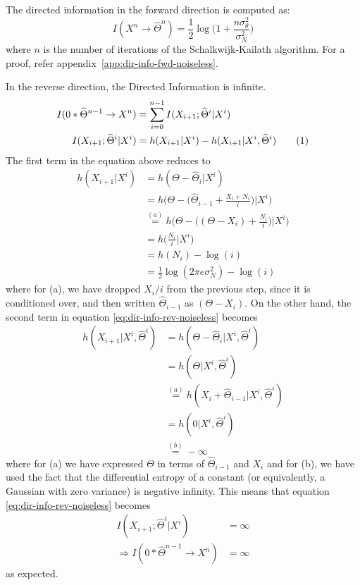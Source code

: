 \documentclass[letterpaper, 10pt, conference]{ieeeconf}
\newcommand\numberthis{\stepcounter{equation}\tag{\theequation}}
\begin{document}
The directed information in the forward direction is computed as:
\begin{equation*}
	I(X^{n} \rightarrow \widehat{\Theta}^{n}) = \frac{1}{2}\log \bigg( 1+\frac{n\sigma_{\theta}^{2}}{\sigma_{N}^{2}} \bigg)
\end{equation*}
where $n$ is the number of iterations of the Schalkwijk-Kailath algorithm. For a proof, refer appendix~\ref{app:dir-info-fwd-noiseless}.

In the reverse direction, the Directed Information is infinite.
\begin{align*}
	I(0*\widehat{\Theta}^{n-1}\rightarrow X^{n}) &= \sum_{i=0}^{n-1}I(X_{i+1};\widehat{\Theta}^{i}|X^{i}) \\
	I(X_{i+1};\widehat{\Theta}^{i}|X^{i})        &= h(X_{i+1}|X^{i}) - h(X_{i+1}|X^{i},\widehat{\Theta}^{i}) \numberthis \label{eq:dir-info-rev-noiseless}
\end{align*}
The first term in the equation above reduces to
\begin{align*}
	h(X_{i+1}|X^{i}) &= h(\Theta-\widehat{\Theta}_{i}|X^{i}) \\
					 &= h \bigg( \Theta- \bigg( \widehat{\Theta}_{i-1}+\frac{X_{i}+N_{i}}{i} \bigg) \bigg| X^{i} \bigg) \\
					 &\overset{(a)}{=} h \bigg( \Theta- \bigg( (\Theta - X_{i}) + \frac{N_{i}}{i} \bigg) \bigg| X^{i} \bigg) \\
					 &= h \bigg( \frac{N_{i}}{i} \bigg| X^{i} \bigg) \\
					 &= h(N_{i}) -\log(i) \\
					 &= \frac{1}{2}\log(2\pi e\sigma_{N}^{2}) -\log(i)
\end{align*}
where for (a), we have dropped $X_i/i$ from the previous step, since it is conditioned over, and then written $\widehat\Theta_{i-1}$ as $(\Theta - X_i)$. On the other hand, the second term in equation \eqref{eq:dir-info-rev-noiseless} becomes
\begin{align*}
	h(X_{i+1} | X^i, \widehat\Theta^i) &= h(\Theta - \widehat\Theta_i | X^i, \widehat\Theta^i) \\
									   &= h(\Theta | X^i, \widehat\Theta^i) \\
									   &\overset{(a)}{=} h(X_i + \widehat\Theta_{i-1} | X^i, \widehat\Theta^i) \\
									   &= h(0 | X^i, \widehat\Theta^i) \\
									   &\overset{(b)}{=} - \infty
\end{align*}
where for (a) we have expressed $\Theta$ in terms of $\widehat\Theta_{i-1}$ and $X_i$ and for (b), we have used the fact that the differential entropy of a constant (or equivalently, a Gaussian with zero variance) is negative infinity. This means that equation \eqref{eq:dir-info-rev-noiseless} becomes
\begin{align*}
	I(X_{i+1};\widehat{\Theta}^{i}|X^{i}) &= \infty \\
	\Rightarrow I(0*\widehat{\Theta}^{n-1}\rightarrow X^{n}) &= \infty
\end{align*}
as expected.
\end{document}

